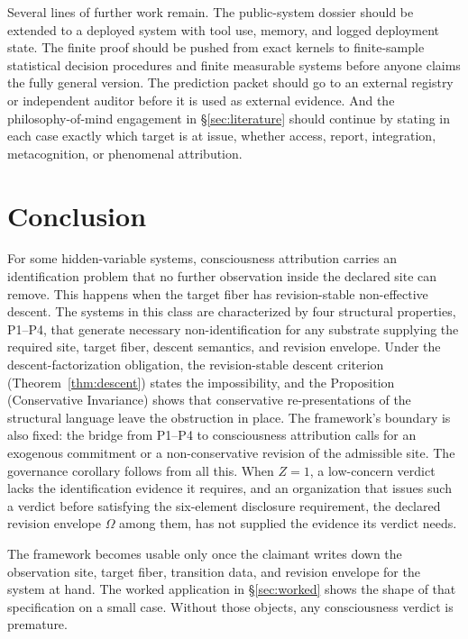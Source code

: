 \documentclass[11pt]{article}
\begin{document}
Several lines of further work remain. The public-system dossier should
be extended to a deployed system with tool use, memory, and logged deployment
state. The finite proof should be pushed from exact kernels to finite-sample
statistical decision procedures and finite measurable systems before anyone
claims the fully general version. The prediction packet should go to an external
registry or independent auditor before it is used as external evidence. And the
philosophy-of-mind engagement in \S\ref{sec:literature} should continue by
stating in each case exactly which target is at issue, whether access, report,
integration, metacognition, or phenomenal attribution.

\section{Conclusion}
\label{sec:conclusion}

For some hidden-variable systems, consciousness attribution carries an
identification problem that no further observation inside the declared site can
remove. This happens when the target fiber has revision-stable non-effective
descent. The systems in this class are characterized by four structural
properties, P1--P4, that generate necessary non-identification for any substrate
supplying the required site, target fiber, descent semantics, and revision
envelope. Under the descent-factorization obligation, the revision-stable
descent criterion (Theorem~\ref{thm:descent}) states the impossibility, and the
Proposition (Conservative Invariance) shows that conservative re-presentations of
the structural language leave the obstruction in place. The framework's boundary
is also fixed: the bridge from P1--P4 to consciousness attribution calls
for an exogenous commitment or a non-conservative revision of the admissible
site. The governance corollary follows from all this. When $Z = 1$, a
low-concern verdict lacks the identification evidence it requires, and an
organization that issues such a verdict before satisfying the six-element
disclosure requirement, the declared revision envelope $\Omega$ among them, has
not supplied the evidence its verdict needs.

The framework becomes usable only once the claimant writes down the observation
site, target fiber, transition data, and revision envelope for the system
at hand. The worked application in \S\ref{sec:worked} shows the shape of that
specification on a small case. Without those objects, any consciousness verdict
is premature.
\end{document}
